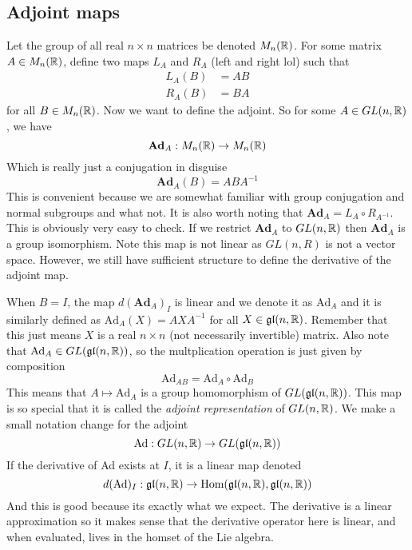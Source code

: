 \subsection{Adjoint maps}
Let the group of all real $n\times n$ matrices be denoted $M_n(\mathbb{R})$. For some matrix
$A\in M_n(\mathbb{R})$, define two maps $L_A$ and $R_A$ (left and right lol) such that
\begin{align*}
    L_A(B) &= AB\\
    R_A(B) &= BA
\end{align*}
for all $B\in M_n(\mathbb{R})$. Now we want to define the adjoint. So for some $A\in GL(n,\mathbb{R})$,
we have
\begin{equation*}
    \textbf{Ad}_A: M_n(\mathbb{R}) \to M_n(\mathbb{R})
\end{equation*}
Which is really just a conjugation in disguise
\begin{equation}
    \textbf{Ad}_A(B) = ABA^{-1}
\end{equation}
This is convenient because we are somewhat familiar with group conjugation and normal
subgroups and what not. It is also worth noting that $\textbf{Ad}_A = L_A
\circ R_{A^{-1}}$. This is obviously very easy to check. If we restrict $\textbf{Ad}_A$
to $GL(n,\mathbb{R})$ then $\textbf{Ad}_A$ is a group isomorphism. Note this map
is not linear as $GL(n,R)$ is not a vector space. However, we still have sufficient
structure to define the derivative of the adjoint map.

When $B=I$, the map $d(\textbf{Ad}_A)_I$ is linear and we denote it as $\text{Ad}_A$
and it is similarly defined as $\text{Ad}_A(X) = AXA^{-1}$ for all $X \in \mathfrak{gl}(n,\mathbb{R})$.
Remember that this just means $X$ is a real $n\times n$ (not necessarily invertible)
matrix. Also note that $\text{Ad}_A \in GL(\mathfrak{gl}(n,\mathbb{R}))$, so the multplication
operation is just given by composition
\begin{equation*}
    \text{Ad}_{AB} = \text{Ad}_A \circ \text{Ad}_B
\end{equation*}
This means that $A \mapsto \text{Ad}_A$ is a group homomorphism of $GL(\mathfrak{gl}(n,\mathbb{R}))$.
This map is so special that it is called the \textit{adjoint representation} of
$GL(n,\mathbb{R})$. We make a small notation change for the adjoint
\begin{equation*}
    \text{Ad}: GL(n,\mathbb{R}) \to GL(\mathfrak{gl}(n,\mathbb{R}))
\end{equation*}
If the derivative of Ad exists at $I$, it is a linear map denoted
\begin{equation}
    d(\text{Ad})_I:\mathfrak{gl}(n,\mathbb{R}) \to \text{Hom}(\mathfrak{gl}(n,\mathbb{R}),\mathfrak{gl}(n,\mathbb{R}))
\end{equation}
And this is good because its exactly what we expect. The derivative is a linear approximation
so it makes sense that the derivative operator here is linear, and when evaluated,
lives in the homset of the Lie algebra.


